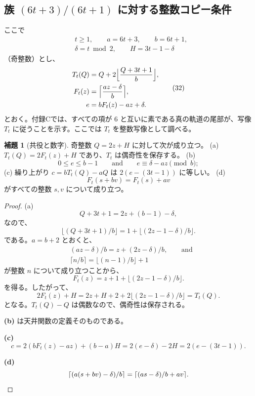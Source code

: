 \documentclass[11pt,reqno]{amsart}
\theoremstyle{definition}
\newtheorem{lemma}[theorem]{補題}
\theoremstyle{definition}
\theoremstyle{remark}
\begin{document}
\subsection{\texorpdfstring{族 \((6t+3)/(6t+1)\) に対する整数コピー条件}{族 (6t+3)/(6t+1) に対する整数コピー条件}}\label{sec:B.4}

ここで
\[
\begin{aligned}
&t\ge1,\qquad a=6t+3,\qquad b=6t+1,\\
&\delta=t\bmod2,\qquad H=3t-1-\delta
\end{aligned}
\]
（奇整数）とし、
\[
\begin{aligned}
T_t(Q)&=Q+2\Bigl\lfloor\frac{Q+3t+1}{b}\Bigr\rfloor,\\
F_t(z)&=\Bigl\lceil\frac{az-\delta}{b}\Bigr\rceil,\\
e&=bF_t(z)-az+\delta .
\end{aligned}
\tag{32}\label{eq:32}
\]
とおく。付録Cでは、すべての項が \(6\) と互いに素である真の軌道の尾部が、写像 \(T_t\) に従うことを示す。ここでは \(T_t\) を整数写像として調べる。

\begin{samepage}
\begin{lemma}[共役と数字]\leavevmode\label{thm:52}
奇整数 \(Q=2z+H\) に対して次が成り立つ。
(a) \(T_t(Q)=2F_t(z)+H\) であり、\(T_t\) は偶奇性を保存する。
(b)
\[
0\le e\le b-1\qquad \text{and}\qquad e\equiv\delta-az\pmod b;
\]
(c) 繰り上がり
\(c=bT_t(Q)-aQ\) は \(2(e-(3t-1))\) に等しい。
(d)
\[
F_t(s+bv)=F_t(s)+av
\]
がすべての整数 \(s,v\) について成り立つ。
\label{thm-end:52}
\end{lemma}
\end{samepage}

\begin{proof}\leavevmode\label{proof:52}
(a)
\[
Q+3t+1=2z+(b-1)-\delta,
\]
なので、
\[
\lfloor(Q+3t+1)/b\rfloor=1+\lfloor(2z-1-\delta)/b\rfloor.
\]
である。\(a=b+2\) とおくと、
\[
\begin{aligned}
&(az-\delta)/b=z+(2z-\delta)/b,\qquad\text{and}\\
&\lceil n/b\rceil=\lfloor(n-1)/b\rfloor+1
\end{aligned}
\]
が整数 \(n\) について成り立つことから、
\[
F_t(z)=z+1+\lfloor(2z-1-\delta)/b\rfloor.
\]
を得る。したがって、
\[
2F_t(z)+H=2z+H+2+2\lfloor(2z-1-\delta)/b\rfloor=T_t(Q).
\]
となる。\(T_t(Q)-Q\) は偶数なので、偶奇性は保存される。

\textbf{(b)} は天井関数の定義そのものである。

\textbf{(c)}
\[
c=2(bF_t(z)-az)+(b-a)H=2(e-\delta)-2H=2(e-(3t-1)).
\]

\textbf{(d)}
\[
\lceil(a(s+bv)-\delta)/b\rceil=\lceil(as-\delta)/b+av\rceil.\qedhere
\]
\end{proof}
\end{document}
